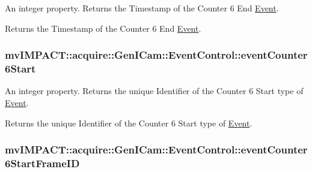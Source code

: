 An integer property. Returns the Timestamp of the Counter 6 End \hyperlink{classmv_i_m_p_a_c_t_1_1acquire_1_1_event}{Event}. 

Returns the Timestamp of the Counter 6 End \hyperlink{classmv_i_m_p_a_c_t_1_1acquire_1_1_event}{Event}. \hypertarget{classmv_i_m_p_a_c_t_1_1acquire_1_1_gen_i_cam_1_1_event_control_a4b6564d7ef97ba5ffe3545845f56c2f2}{
\subsubsection[{event\+Counter6\+Start}]{ mv\+I\+M\+P\+A\+C\+T\+::acquire\+::\+Gen\+I\+Cam\+::\+Event\+Control\+::event\+Counter6\+Start}}\label{classmv_i_m_p_a_c_t_1_1acquire_1_1_gen_i_cam_1_1_event_control_a4b6564d7ef97ba5ffe3545845f56c2f2}


An integer property. Returns the unique Identifier of the Counter 6 Start type of \hyperlink{classmv_i_m_p_a_c_t_1_1acquire_1_1_event}{Event}. 

Returns the unique Identifier of the Counter 6 Start type of \hyperlink{classmv_i_m_p_a_c_t_1_1acquire_1_1_event}{Event}. \hypertarget{classmv_i_m_p_a_c_t_1_1acquire_1_1_gen_i_cam_1_1_event_control_ae45883f01fa45a36a2e6e6532f3bcb74}{
\subsubsection[{event\+Counter6\+Start\+Frame\+I\+D}]{ mv\+I\+M\+P\+A\+C\+T\+::acquire\+::\+Gen\+I\+Cam\+::\+Event\+Control\+::event\+Counter6\+Start\+Frame\+I\+D}}\label{classmv_i_m_p_a_c_t_1_1acquire_1_1_gen_i_cam_1_1_event_control_ae45883f01fa45a36a2e6e6532f3bcb74}


